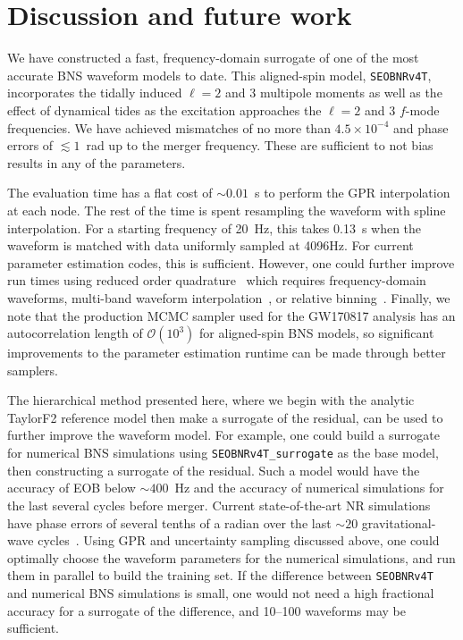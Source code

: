 \documentclass[prd,aps,letter,twocolumn,floatfix,notitlepage,nofootinbib]{revtex4-1}
\begin{document}
\section{Discussion and future work}
\label{sec:discussion}

We have constructed a fast, frequency-domain surrogate of one of the most accurate BNS waveform models to date. This aligned-spin model, \texttt{SEOBNRv4T}, incorporates the tidally induced $\ell=2$ and 3 multipole moments as well as the effect of dynamical tides as the excitation approaches the $\ell=2$ and 3 $f$-mode frequencies. We have achieved mismatches of no more than $4.5 \times 10^{-4}$ and phase errors of $\lesssim 1$~rad up to the merger frequency. These are sufficient to not bias results in any of the parameters.

The evaluation time has a flat cost of $\sim 0.01$~s to perform the GPR interpolation at each node. The rest of the time is spent resampling the waveform with spline interpolation. For a starting frequency of 20~Hz, this takes 0.13~s when the waveform is matched with data uniformly sampled at 4096Hz. For current parameter estimation codes, this is sufficient. However, one could further improve run times using reduced order quadrature~\cite{Antil2013, CanizaresFieldGair2013, CanizaresFieldGair2015, Smith:2016qas} which requires frequency-domain waveforms, multi-band waveform interpolation~\cite{VinciguerraVeitchMandel2017}, or relative binning~\cite{Zackay:2018qdy}. Finally, we note that the production MCMC sampler used for the GW170817 analysis has an autocorrelation length of $\mathcal{O}(10^3)$ for aligned-spin BNS models, so significant improvements to the parameter estimation runtime can be made through better samplers. 

The hierarchical method presented here, where we begin with the analytic TaylorF2 reference model then make a surrogate of the residual, can be used to further improve the waveform model. For example, one could build a surrogate for numerical BNS simulations using \texttt{SEOBNRv4T\_surrogate} as the base model, then constructing a surrogate of the residual. Such a model would have the accuracy of EOB below $\sim 400$~Hz and the accuracy of numerical simulations for the last several cycles before merger. Current state-of-the-art NR simulations have phase errors of several tenths of a radian over the last $\sim 20$ gravitational-wave cycles~\cite{DietrichHinderer2017, KiuchiKawaguchiKyutoku2017}. Using GPR and uncertainty sampling discussed above, one could optimally choose the waveform parameters for the numerical simulations, and run them in parallel to build the training set. If the difference between \texttt{SEOBNRv4T} and numerical BNS simulations is small, one would not need a high fractional accuracy for a surrogate of the difference, and 10--100 waveforms may be sufficient.
\end{document}
